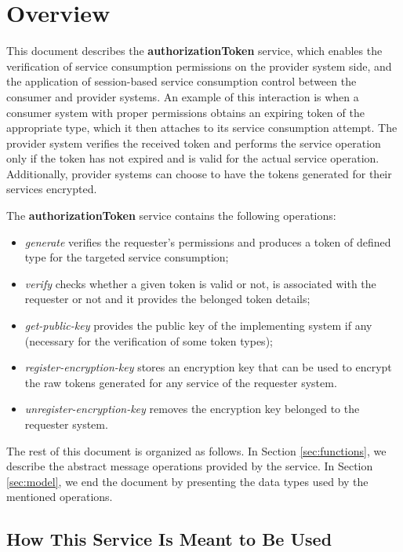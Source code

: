 \documentclass[a4paper]{arrowhead}
\begin{document}
\section{Overview}
\label{sec:overview}
This document describes the \textbf{authorizationToken} service, which enables the verification of service consumption permissions on the provider system side, and the application of session-based service consumption control between the consumer and provider systems. An example of this interaction is when a consumer system with proper permissions obtains an expiring token of the appropriate type, which it then attaches to its service consumption attempt. The provider system verifies the received token and performs the service operation only if the token has not expired and is valid for the actual service operation. Additionally, provider systems can choose to have the tokens generated for their services encrypted.

The \textbf{authorizationToken} service contains the following operations:

\begin{itemize}
    \item \textit{generate} verifies the requester's permissions and produces a token of defined type for the targeted service consumption;
    \item \textit{verify} checks whether a given token is valid or not, is associated with the requester or not and it provides the belonged token details;
    \item \textit{get-public-key} provides the public key of the implementing system if any (necessary for the verification of some token types);
    \item \textit{register-encryption-key} stores an encryption key that can be used to encrypt the raw tokens generated for any service of the requester system.
    \item \textit{unregister-encryption-key} removes the encryption key belonged to the requester system.
\end{itemize}

The rest of this document is organized as follows.
In Section \ref{sec:functions}, we describe the abstract message operations provided by the service.
In Section \ref{sec:model}, we end the document by presenting the data types used by the mentioned operations.

\subsection{How This Service Is Meant to Be Used}
\end{document}
